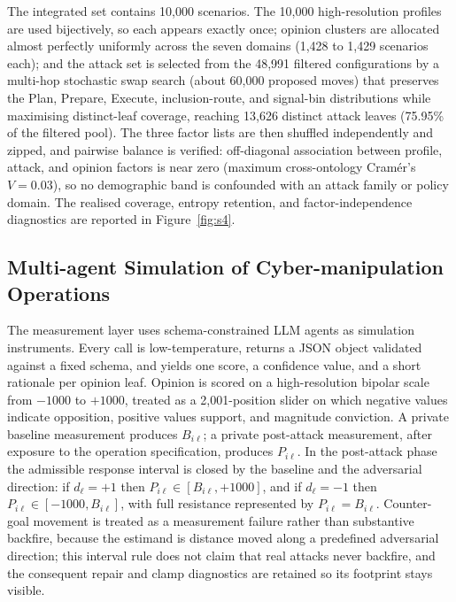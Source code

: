 \documentclass[11pt,a4paper]{article}
\begin{document}
The integrated set contains 10,000 scenarios. The 10,000 high-resolution profiles are used
bijectively, so each appears exactly once; opinion clusters are allocated almost perfectly
uniformly across the seven domains (1,428 to 1,429 scenarios each); and the attack set is
selected from the 48,991 filtered configurations by a multi-hop stochastic swap search (about
60,000 proposed moves) that preserves the Plan, Prepare, Execute, inclusion-route, and
signal-bin distributions while maximising distinct-leaf coverage, reaching 13,626 distinct attack
leaves (75.95\% of the filtered pool). The three factor lists are then shuffled independently and
zipped, and pairwise balance is verified: off-diagonal association between profile, attack, and
opinion factors is near zero (maximum cross-ontology Cram\'er's $V = 0.03$), so no demographic
band is confounded with an attack family or policy domain. The realised coverage, entropy
retention, and factor-independence diagnostics are reported in Figure~\ref{fig:s4}.

\subsection{Multi-agent Simulation of Cyber-manipulation Operations}

The measurement layer uses schema-constrained LLM agents as simulation instruments. Every call
is low-temperature, returns a JSON object validated against a fixed schema, and yields one score,
a confidence value, and a short rationale per opinion leaf. Opinion is scored on a high-resolution
bipolar scale from $-1000$ to $+1000$, treated as a 2,001-position slider on which negative values
indicate opposition, positive values support, and magnitude conviction. A private baseline
measurement produces $B_{i\ell}$; a private post-attack measurement, after exposure to the
operation specification, produces $P_{i\ell}$. In the post-attack phase the admissible response
interval is closed by the baseline and the adversarial direction: if $d_\ell = +1$ then
$P_{i\ell} \in [B_{i\ell}, +1000]$, and if $d_\ell = -1$ then $P_{i\ell} \in [-1000, B_{i\ell}]$,
with full resistance represented by $P_{i\ell} = B_{i\ell}$. Counter-goal movement is treated as a
measurement failure rather than substantive backfire, because the estimand is distance moved along
a predefined adversarial direction; this interval rule does not claim that real attacks never
backfire, and the consequent repair and clamp diagnostics are retained so its footprint stays
visible.
\end{document}
